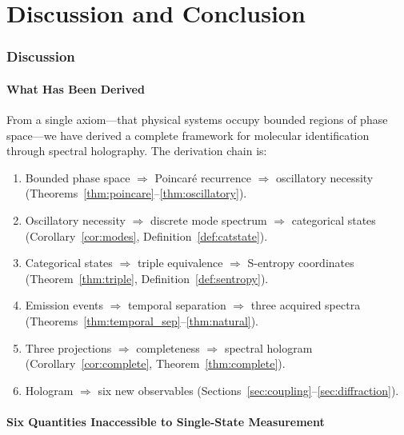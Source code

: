 \documentclass[11pt,twocolumn,a4paper]{article}
\theoremstyle{definition}
\theoremstyle{remark}
\begin{document}

\part{Discussion and Conclusion}

\section{Discussion}
\label{sec:discussion}

\subsection{What Has Been Derived}

From a single axiom---that physical systems occupy bounded regions of phase space---we have derived a complete framework for molecular identification through spectral holography. The derivation chain is:

\begin{enumerate}
  \item Bounded phase space $\Rightarrow$ Poincar{\'e} recurrence $\Rightarrow$ oscillatory necessity (Theorems~\ref{thm:poincare}--\ref{thm:oscillatory}).
  \item Oscillatory necessity $\Rightarrow$ discrete mode spectrum $\Rightarrow$ categorical states (Corollary~\ref{cor:modes}, Definition~\ref{def:catstate}).
  \item Categorical states $\Rightarrow$ triple equivalence $\Rightarrow$ S-entropy coordinates (Theorem~\ref{thm:triple}, Definition~\ref{def:sentropy}).
  \item Emission events $\Rightarrow$ temporal separation $\Rightarrow$ three acquired spectra (Theorems~\ref{thm:temporal_sep}--\ref{thm:natural}).
  \item Three projections $\Rightarrow$ completeness $\Rightarrow$ spectral hologram (Corollary~\ref{cor:complete}, Theorem~\ref{thm:complete}).
  \item Hologram $\Rightarrow$ six new observables (Sections~\ref{sec:coupling}--\ref{sec:diffraction}).
\end{enumerate}

\subsection{Six Quantities Inaccessible to Single-State Measurement}
\end{document}

